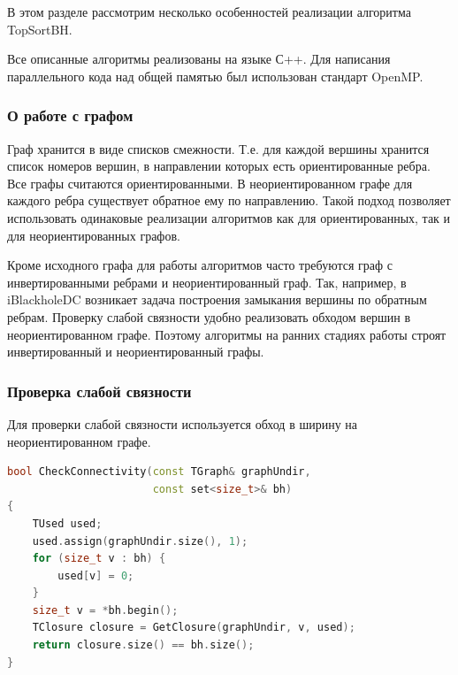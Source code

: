\documentclass[12pt,a4paper,oneside,openany]{article}
\theoremstyle{definition}
\theoremstyle{lemma}
\theoremstyle{remark}
\begin{document}
В этом разделе рассмотрим несколько особенностей реализации алгоритма TopSortBH.

Все описанные алгоритмы реализованы на языке С++. Для написания параллельного кода
над общей памятью был использован стандарт OpenMP.

\subsubsection{О работе с графом}\label{subsubsec:graph}

Граф хранится в виде списков смежности. Т.е. для каждой вершины хранится список номеров вершин,
в направлении которых есть ориентированные ребра. Все графы считаются ориентированными.
В неориентированном графе для каждого ребра существует обратное ему по направлению. Такой подход
позволяет использовать одинаковые реализации алгоритмов как для ориентированных,
так и для неориентированных графов.

Кроме исходного графа для работы алгоритмов часто требуются граф с инвертированными ребрами и неориентированный граф.
Так, например, в iBlackholeDC возникает задача построения замыкания вершины по обратным ребрам.
Проверку слабой связности удобно реализовать обходом вершин в неориентированном графе.
Поэтому алгоритмы на ранних стадиях работы строят инвертированный и неориентированный графы.

%
%

\subsubsection{Проверка слабой связности}\label{subsubsec:connectivitycheck}

Для проверки слабой связности используется обход в ширину на неориентированном графе.

\begin{lstlisting}[language=C++, caption=Проверка слабой связности, label=code:connectivity]
bool CheckConnectivity(const TGraph& graphUndir,
                       const set<size_t>& bh)
{
    TUsed used;
    used.assign(graphUndir.size(), 1);
    for (size_t v : bh) {
        used[v] = 0;
    }
    size_t v = *bh.begin();
    TClosure closure = GetClosure(graphUndir, v, used);
    return closure.size() == bh.size();
}
\end{lstlisting}
\end{document}

